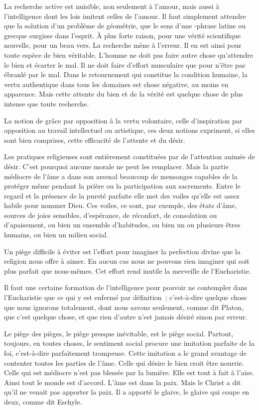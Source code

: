 \documentclass[french,twoside]{book} %
\begin{document}
La recherche active est nuisible, non seulement à l'amour, mais aussi à l'intelligence dont les lois imitent celles de l'amour. Il faut simplement attendre que la solution d'un problème de géométrie, que le sens d'une -phrase latine ou grecque surgisse dans l'esprit. À plus forte raison, pour une vérité scientifique nouvelle, pour un beau vers. La recherche mène à l'erreur. Il en est ainsi pour toute espèce de bien véritable. L'homme ne doit pas faire autre chose qu'attendre le bien et écarter le mal. Il ne doit faire d'effort musculaire que pour n'être pas ébranlé par le mal. Dans le retournement qui constitue la condition humaine, la vertu authentique dans tous les domaines est chose négative, au moins en apparence. Mais cette attente du bien et de la vérité est quelque chose de plus intense que toute recherche.\par
La notion de grâce par opposition à la vertu volontaire, celle d'inspiration par opposition au travail intellectuel ou artistique, ces deux notions expriment, si elles sont bien comprises, cette efficacité de l'attente et du désir.\par
Les pratiques religieuses sont entièrement constituées par de l'attention animée de désir. C'est pourquoi aucune morale ne peut les remplacer. Mais la partie médiocre de l'âme a dans son arsenal beaucoup de mensonges capables de la protéger même pendant la prière ou la participation aux sacrements. Entre le regard et la présence de la pureté parfaite elle met des voiles qu'elle est assez habile pour nommer Dieu. Ces voiles, ce sont, par exemple, des états d'âme, sources de joies sensibles, d'espérance, de réconfort, de consolation ou d'apaisement, ou bien un ensemble d'habitudes, ou bien un ou plusieurs êtres humains, ou bien un milieu social.\par
Un piège difficile à éviter est l'effort pour imaginer la perfection divine que la religion nous offre à aimer. En aucun cas nous ne pouvons rien imaginer qui soit plus parfait que nous-mêmes. Cet effort rend inutile la merveille de l'Eucharistie.\par
Il faut une certaine formation de l'intelligence pour pouvoir ne contempler dans l'Eucharistie que ce qui y est enfermé par définition ; c'est-à-dire quelque chose que nous ignorons totalement, dont nous savons seulement, comme dit Platon, que c'est quelque chose, et que rien d'autre n'est jamais désiré sinon par erreur.\par
Le piège des pièges, le piège presque inévitable, est le piège social. Partout, toujours, en toutes choses, le sentiment social procure une imitation parfaite de la foi, c'est-à-dire parfaitement trompeuse. Cette imitation a le grand avantage de contenter toutes les parties de l'âme. Celle qui désire le bien croit être nourrie. Celle qui est médiocre n'est pas blessée par la lumière. Elle est tout à fait à l'aise. Ainsi tout le monde est d'accord. L'âme est dans la paix. Mais le Christ a dit qu'il ne venait pas apporter la paix. Il a apporté le glaive, le glaive qui coupe en deux, comme dit Eschyle.\par
\end{document}

